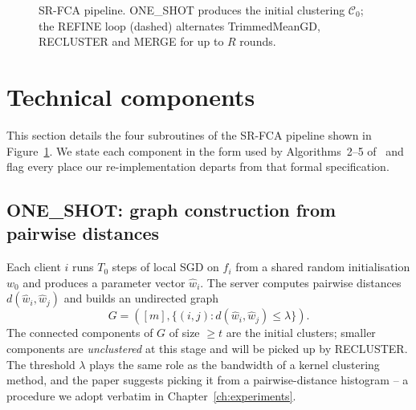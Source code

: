 \begin{figure}[h]
\caption{SR-FCA pipeline. ONE\_SHOT produces the initial clustering $\mathcal{C}_0$; the REFINE loop (dashed) alternates TrimmedMeanGD, RECLUSTER and MERGE for up to $R$ rounds.}\label{fig:pipeline}
\end{figure}

\section{Technical components}\label{sec:components}

This section details the four subroutines of the SR-FCA pipeline shown in Figure~\ref{fig:pipeline}. We state each component in the form used by Algorithms~2--5 of~\parencite{vardhan2024srfca} and flag every place our re-implementation departs from that formal specification.

\subsection{ONE\_SHOT: graph construction from pairwise distances}\label{sec:oneshot}

Each client $i$ runs $T_0$ steps of local SGD on $f_i$ from a shared random initialisation $w_0$ and produces a parameter vector $\hat{w}_i$. The server computes pairwise distances $d(\hat{w}_i, \hat{w}_j)$ and builds an undirected graph
\begin{equation}\label{eq:oneshot-graph}
    G = ([m], \{(i,j) : d(\hat{w}_i, \hat{w}_j) \le \lambda\}).
\end{equation}
The connected components of $G$ of size $\ge t$ are the initial clusters; smaller components are \emph{unclustered} at this stage and will be picked up by RECLUSTER. The threshold $\lambda$ plays the same role as the bandwidth of a kernel clustering method, and the paper suggests picking it from a pairwise-distance histogram -- a procedure we adopt verbatim in Chapter~\ref{ch:experiments}.

